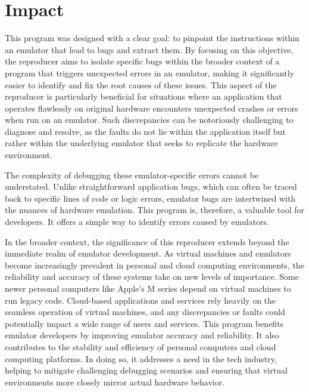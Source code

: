 \section{Impact}
This program was designed with a clear goal: to pinpoint the instructions within an emulator that lead to bugs and extract them.
By focusing on this objective, the reproducer aims to isolate specific bugs within the broader context of a program that triggers unexpected errors in an emulator, making it significantly easier to identify and fix the root causes of these issues.
This aspect of the reproducer is particularly beneficial for situations where an application that operates flawlessly on original hardware encounters unexpected crashes or errors when run on an emulator.
Such discrepancies can be notoriously challenging to diagnose and resolve, as the faults do not lie within the application itself but rather within the underlying emulator that seeks to replicate the hardware environment.

The complexity of debugging these emulator-specific errors cannot be understated.
Unlike straightforward application bugs, which can often be traced back to specific lines of code or logic errors, emulator bugs are intertwined with the nuances of hardware emulation.
This program is, therefore, a valuable tool for developers. It offers a simple way to identify errors caused by emulators.

In the broader context, the significance of this reproducer extends beyond the immediate realm of emulator development.
As virtual machines and emulators become increasingly prevalent in personal and cloud computing environments, the reliability and accuracy of these systems take on new levels of importance.
Some newer personal computers like Apple's M series depend on virtual machines \cite{rosetta} to run legacy code.
Cloud-based applications and services rely heavily on the seamless operation of virtual machines, and any discrepancies or faults could potentially impact a wide range of users and services.
This program benefits emulator developers by improving emulator accuracy and reliability. It also contributes to the stability and efficiency of personal computers and cloud computing platforms.
In doing so, it addresses a need in the tech industry, helping to mitigate challenging debugging scenarios and ensuring that virtual environments more closely mirror actual hardware behavior.

